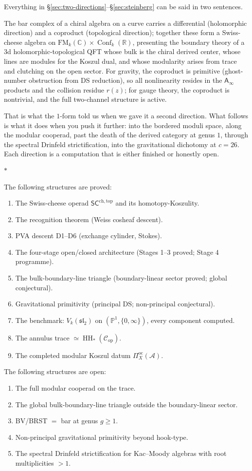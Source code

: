 \documentclass[11pt]{article}
\newcommand{\cA}{\mathcal{A}}
\newcommand{\cC}{\mathcal{C}}
\newcommand{\fsl}{\mathfrak{sl}}
\newcommand{\C}{\mathbb{C}}
\newcommand{\R}{\mathbb{R}}
\newcommand{\bP}{\mathbb{P}}
\newcommand{\Ainf}{\mathsf{A}_{\infty}}
\newcommand{\SCchtop}{\mathsf{SC}^{\mathrm{ch,top}}}
\newcommand{\FM}{\mathrm{FM}}
\newcommand{\HH}{\operatorname{HH}}
\DeclareMathOperator{\Conf}{Conf}
\newcommand{\sep}{\bigskip\begin{center}$*$\end{center}\medskip}
\begin{document}
Everything in \S\ref{sec:two-directions}--\S\ref{sec:steinberg}
can be said in two sentences.

The bar complex of a chiral algebra on a curve carries a
differential (holomorphic direction) and a coproduct (topological
direction); together these form a Swiss-cheese algebra on
$\FM_k(\C) \times \Conf_k(\R)$, presenting the boundary theory
of a $3$d holomorphic-topological QFT whose bulk is the chiral
derived center, whose lines are modules for the Koszul dual, and
whose modularity arises from trace and clutching on the open
sector.  For gravity, the coproduct is primitive (ghost-number
obstruction from DS reduction), so all nonlinearity resides in the
$\Ainf$ products and the collision residue $r(z)$; for gauge
theory, the coproduct is nontrivial, and the full two-channel
structure is active.

That is what the $1$-form told us when we gave it a second
direction.  What follows is what it does when you push it further:
into the bordered moduli space, along the modular cooperad, past
the death of the derived category at genus $1$, through the
spectral Drinfeld strictification, into the gravitational
dichotomy at $c = 26$.  Each direction is a computation that
is either finished or honestly open.

\sep

The following structures are proved:
\begin{enumerate}[nosep]
\item The Swiss-cheese operad $\SCchtop$ and its
  homotopy-Koszulity.
\item The recognition theorem (Weiss cosheaf descent).
\item PVA descent D1--D6 (exchange cylinder, Stokes).
\item The four-stage open/closed architecture (Stages 1--3
  proved; Stage 4 programme).
\item The bulk-boundary-line triangle (boundary-linear sector
  proved; global conjectural).
\item Gravitational primitivity (principal DS; non-principal
  conjectural).
\item The benchmark: $V_k(\fsl_2)$ on $(\bP^1, \{0,\infty\})$,
  every component computed.
\item The annulus trace $\simeq \HH_*(\cC_{\mathrm{op}})$.
\item The completed modular Koszul datum $\Pi^{\mathrm{oc}}_X(\cA)$.
\end{enumerate}

The following structures are open:
\begin{enumerate}[nosep]
\item The full modular cooperad on the trace.
\item The global bulk-boundary-line triangle outside the
  boundary-linear sector.
\item BV/BRST $=$ bar at genus $g \geq 1$.
\item Non-principal gravitational primitivity beyond hook-type.
\item The spectral Drinfeld strictification for Kac--Moody
  algebras with root multiplicities $> 1$.
\end{enumerate}
\end{document}
